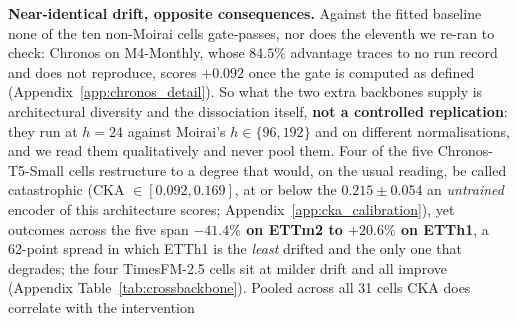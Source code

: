 \textbf{Near-identical drift, opposite consequences.}  Against the fitted baseline
none of the ten non-Moirai cells gate-passes, nor does the eleventh we re-ran to
check: Chronos on M4-Monthly, whose $84.5\%$ advantage traces to no run record
and does not reproduce, scores $+0.092$ once the gate is computed as defined
(Appendix~\ref{app:chronos_detail}).  So what the two extra backbones supply
is architectural diversity and the dissociation itself, \textbf{not a controlled
replication}: they run at $h{=}24$ against Moirai's $h{\in}\{96,192\}$ and on
different normalisations, and we read them qualitatively and never pool them.  Four
of the five Chronos-T5-Small cells restructure to a degree that would, on the usual
reading, be called catastrophic (CKA ${\in}[0.092, 0.169]$, at or below the
$0.215{\pm}0.054$ an \emph{untrained} encoder of this architecture scores;
Appendix~\ref{app:cka_calibration}), yet outcomes across the five span
\textbf{$-41.4\%$ on ETTm2 to $+20.6\%$ on ETTh1}, a 62-point spread in which ETTh1
is the \emph{least} drifted and the only one that degrades; the four TimesFM-2.5
cells sit at milder drift and all improve
(Appendix Table~\ref{tab:crossbackbone}).
%
Pooled across all 31 cells CKA does correlate with the intervention
